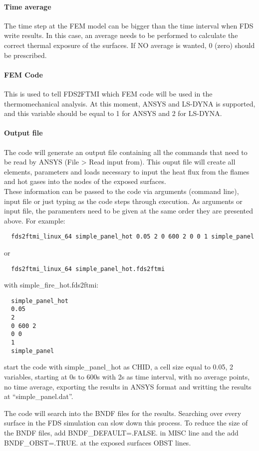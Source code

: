 \documentclass[11pt]{book}
\begin{document}
\paragraph{Time average} 
The time step at the FEM model can be bigger than the time interval when FDS write results. In this case, an average needs to be performed to calculate the correct thermal exposure of the surfaces. If NO average is wanted, 0 (zero) should be prescribed.  
\paragraph{FEM Code}
This is used to tell FDS2FTMI which FEM code will be used in the thermomechanical analysis. At this moment, A{\footnotesize NSYS} and LS-DYNA is supported, and this variable should be equal to 1 for A{\footnotesize NSYS} and 2 for LS-DYNA.
\paragraph{Output file}
The code will generate an output file containing all the commands that need to be read by A{\footnotesize NSYS} (File > Read input from). This ouput file will create all elements, parameters and loads necessary to input the heat flux from the flames and hot gases into the nodes of the exposed surfaces. \\

These information can be passed to the code via arguments (command line), input file or just typing as the code steps through execution. As arguments or input file, the paramenters need to be given at the same order they are presented above. For example:
\begin{verbatim}
  fds2ftmi_linux_64 simple_panel_hot 0.05 2 0 600 2 0 0 1 simple_panel
\end{verbatim}
  or 
\begin{verbatim}
  fds2ftmi_linux_64 simple_panel_hot.fds2ftmi 
\end{verbatim}
with simple\_fire\_hot.fds2ftmi:
\begin{verbatim}
  simple_panel_hot 
  0.05 
  2
  0 600 2 
  0 0
  1
  simple_panel
\end{verbatim}
start the code with simple\_panel\_hot as {\ct CHID}, a cell size equal to 0.05, 2 variables, starting at 0s to 600s with 2s as time interval, with no average points, no time average, exporting the results in A{\footnotesize NSYS} format and writting the results at ``simple\_panel.dat''.

The code will search into the {\ct BNDF} files for the results. Searching over every surface in the FDS simulation can slow down this process. To reduce the size of the {\ct BNDF} files, add {\ct BNDF\_DEFAULT=.FALSE.} in {\ct MISC} line and the add {\ct BNDF\_OBST=.TRUE.} at the exposed surfaces {\ct OBST} lines.
\end{document}

